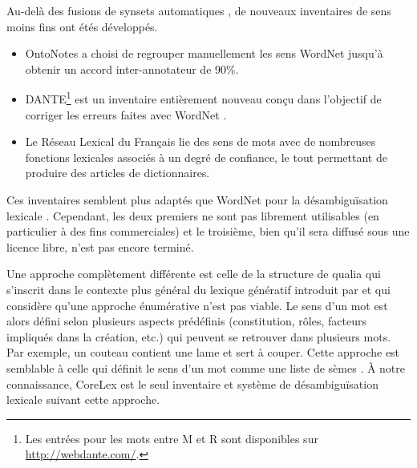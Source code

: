 Au-delà des fusions de synsets automatiques \citep{snow2007learning}, de
nouveaux inventaires de sens moins fins ont étés développés.

\begin{itemize}

    \item OntoNotes \citep{hovy2006ontonotes} a choisi de regrouper
        manuellement les sens WordNet jusqu'à obtenir un accord
        inter-annotateur de 90\%.

    \item DANTE\footnote{Les entrées pour les mots entre M et R sont
        disponibles sur \url{http://webdante.com/}.} \citep{mccarthy2010dante} est un
        inventaire entièrement nouveau conçu dans l'objectif de corriger les
        erreurs faites avec WordNet \citep{kilgarriff2010detailed}.

    \item Le Réseau Lexical du Français \citep{polguere2014principes} lie des sens de
        mots avec de nombreuses fonctions lexicales associés à un degré de
        confiance, le tout permettant de produire des articles de dictionnaires.

\end{itemize}

Ces inventaires semblent plus adaptés que WordNet pour la désambiguïsation
lexicale \citep{navigli2012quick}. Cependant, les deux premiers ne sont pas
librement utilisables (en particulier à des fins commerciales) et le troisième,
bien qu'il sera diffusé sous une licence libre, n'est pas encore terminé.

Une approche complètement différente est celle de la structure de qualia
\citep{johnston1996qualia} qui s'inscrit dans le contexte plus général du
lexique génératif introduit par \cite{pustejovsky1991generative} et qui
considère qu'une approche énumérative n'est pas viable. Le sens d'un mot est
alors défini selon plusieurs aspects prédéfinis (constitution, rôles, facteurs
impliqués dans la création, etc.) qui peuvent se retrouver dans plusieurs mots.
Par exemple, un couteau contient une lame et sert à couper. Cette approche est
semblable à celle qui définit le sens d'un mot comme une liste de sèmes
\citep{rastier1987semantique}. À notre connaissance, CoreLex
\citep{buitelaar1998corelex} est le seul inventaire et système de
désambiguïsation lexicale suivant cette approche.

